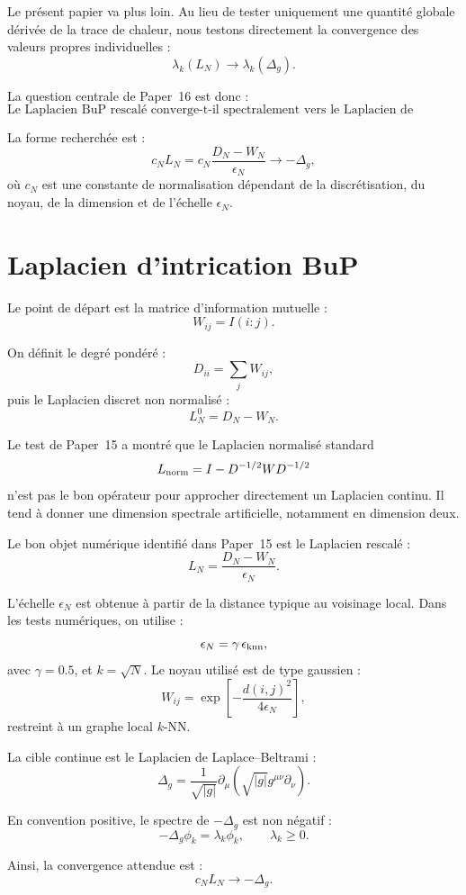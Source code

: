 \documentclass[11pt,a4paper]{article}
\begin{document}
Le présent papier va plus loin. Au lieu de tester uniquement une quantité
globale dérivée de la trace de chaleur, nous testons directement la convergence
des valeurs propres individuelles :
\[
\lambda_k(L_N)
\longrightarrow
\lambda_k(\Delta_g).
\]

La question centrale de Paper~16 est donc :
\[
\boxed{
\text{Le Laplacien BuP rescalé converge-t-il spectralement vers le
Laplacien de Laplace--Beltrami ?}
}
\]

La forme recherchée est :
\[
c_N L_N
=
c_N\frac{D_N-W_N}{\epsilon_N}
\longrightarrow
-\Delta_g,
\]
où \(c_N\) est une constante de normalisation dépendant de la discrétisation,
du noyau, de la dimension et de l'échelle \(\epsilon_N\).

\section{Laplacien d'intrication BuP}

Le point de départ est la matrice d'information mutuelle :
\[
W_{ij}=I(i:j).
\]

On définit le degré pondéré :
\[
D_{ii}=\sum_j W_{ij},
\]
puis le Laplacien discret non normalisé :
\[
L_N^0=D_N-W_N.
\]

Le test de Paper~15 a montré que le Laplacien normalisé standard
\[
L_{\rm norm}=I-D^{-1/2}WD^{-1/2}
\]
n'est pas le bon opérateur pour approcher directement un Laplacien continu.
Il tend à donner une dimension spectrale artificielle, notamment en dimension
deux.

Le bon objet numérique identifié dans Paper~15 est le Laplacien rescalé :
\[
L_N=\frac{D_N-W_N}{\epsilon_N}.
\]

L'échelle \(\epsilon_N\) est obtenue à partir de la distance typique au
voisinage local. Dans les tests numériques, on utilise :
\[
\epsilon_N
=
\gamma\,\epsilon_{\rm knn},
\]
avec \(\gamma=0.5\), et \(k=\sqrt{N}\). Le noyau utilisé est de type gaussien :
\[
W_{ij}
=
\exp\left[
-\frac{d(i,j)^2}{4\epsilon_N}
\right],
\]
restreint à un graphe local \(k\)-NN.

La cible continue est le Laplacien de Laplace--Beltrami :
\[
\Delta_g
=
\frac{1}{\sqrt{|g|}}
\partial_\mu
\left(
\sqrt{|g|}g^{\mu\nu}\partial_\nu
\right).
\]

En convention positive, le spectre de \(-\Delta_g\) est non négatif :
\[
-\Delta_g\phi_k=\lambda_k\phi_k,
\qquad
\lambda_k\geq0.
\]

Ainsi, la convergence attendue est :
\[
c_N L_N\to -\Delta_g.
\]
\end{document}
